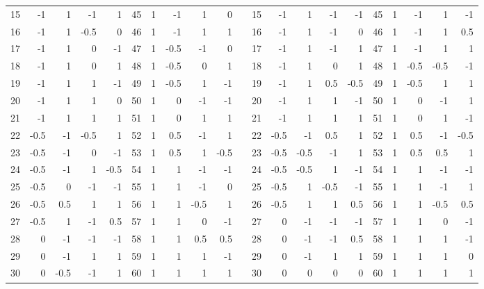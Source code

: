 \begin{table}[h]
{\begin{tabular}{rrrrr|rrrrr|r|rrrrr|rrrrr}
15 & -1   & 1    & -1   & 1    & 45 & 1   & -1   & 1    & 0    &  & 15 & -1   & 1    & -1   & -1   & 45 & 1   & -1   & 1    & -1   \\
16 & -1   & 1    & -0.5 & 0    & 46 & 1   & -1   & 1    & 1    &  & 16 & -1   & 1    & -1   & 0    & 46 & 1   & -1   & 1    & 0.5  \\
17 & -1   & 1    & 0    & -1   & 47 & 1   & -0.5 & -1   & 0    &  & 17 & -1   & 1    & -1   & 1    & 47 & 1   & -1   & 1    & 1    \\
18 & -1   & 1    & 0    & 1    & 48 & 1   & -0.5 & 0    & 1    &  & 18 & -1   & 1    & 0    & 1    & 48 & 1   & -0.5 & -0.5 & -1   \\
19 & -1   & 1    & 1    & -1   & 49 & 1   & -0.5 & 1    & -1   &  & 19 & -1   & 1    & 0.5  & -0.5 & 49 & 1   & -0.5 & 1    & 1    \\
20 & -1   & 1    & 1    & 0    & 50 & 1   & 0    & -1   & -1   &  & 20 & -1   & 1    & 1    & -1   & 50 & 1   & 0    & -1   & 1    \\
21 & -1   & 1    & 1    & 1    & 51 & 1   & 0    & 1    & 1    &  & 21 & -1   & 1    & 1    & 1    & 51 & 1   & 0    & 1    & -1   \\
22 & -0.5 & -1   & -0.5 & 1    & 52 & 1   & 0.5  & -1   & 1    &  & 22 & -0.5 & -1   & 0.5  & 1    & 52 & 1   & 0.5  & -1   & -0.5 \\
23 & -0.5 & -1   & 0    & -1   & 53 & 1   & 0.5  & 1    & -0.5 &  & 23 & -0.5 & -0.5 & -1   & 1    & 53 & 1   & 0.5  & 0.5  & 1    \\
24 & -0.5 & -1   & 1    & -0.5 & 54 & 1   & 1    & -1   & -1   &  & 24 & -0.5 & -0.5 & 1    & -1   & 54 & 1   & 1    & -1   & -1   \\
25 & -0.5 & 0    & -1   & -1   & 55 & 1   & 1    & -1   & 0    &  & 25 & -0.5 & 1    & -0.5 & -1   & 55 & 1   & 1    & -1   & 1    \\
26 & -0.5 & 0.5  & 1    & 1    & 56 & 1   & 1    & -0.5 & 1    &  & 26 & -0.5 & 1    & 1    & 0.5  & 56 & 1   & 1    & -0.5 & 0.5  \\
27 & -0.5 & 1    & -1   & 0.5  & 57 & 1   & 1    & 0    & -1   &  & 27 & 0    & -1   & -1   & -1   & 57 & 1   & 1    & 0    & -1   \\
28 & 0    & -1   & -1   & -1   & 58 & 1   & 1    & 0.5  & 0.5  &  & 28 & 0    & -1   & -1   & 0.5  & 58 & 1   & 1    & 1    & -1   \\
29 & 0    & -1   & 1    & 1    & 59 & 1   & 1    & 1    & -1   &  & 29 & 0    & -1   & 1    & 1    & 59 & 1   & 1    & 1    & 0    \\
30 & 0    & -0.5 & -1   & 1    & 60 & 1   & 1    & 1    & 1    &  & 30 & 0    & 0    & 0    & 0    & 60 & 1   & 1    & 1    & 1   
\end{tabular}
}
\end{table}

